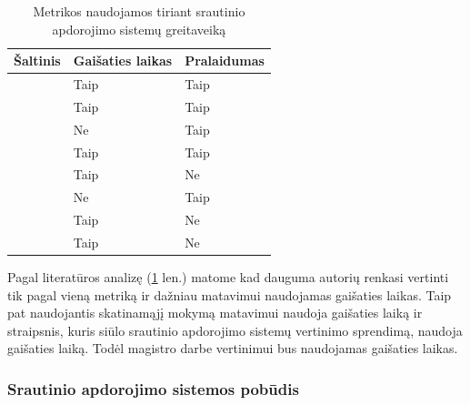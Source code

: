 \documentclass{VUMIFPSbakalaurinis}
\begin{document}
\begin{table}[H]
    \centering
    \begin{tabular}{|l|l|l|}
    \hline
    Šaltinis                 & Gaišaties laikas                 & Pralaidumas                    \\ \hline
    \cite{stonebraker20058}  & Taip                             & Taip                           \\ \hline
    \cite{Karimov2018BenchmarkingDS} & Taip                     & Taip                           \\ \hline
    \cite{hirzel2014catalog} & Ne                               & Taip                           \\ \hline
    \cite{Qian2016Benchmarking} & Taip                          & Taip                           \\ \hline
    \cite{zhang2020heron}    & Taip                             & Ne                             \\ \hline
    \cite{dhalion}           & Ne                               & Taip                           \\ \hline
    \cite{vaquero2018autotuning} & Taip                         & Ne                             \\ \hline
    \cite{Chintapalli2016Benchmarking} & Taip                   & Ne                             \\ \hline
    \end{tabular}
    \caption{Metrikos naudojamos tiriant srautinio apdorojimo sistemų greitaveiką}
\label{metrikos}
\end{table}

Pagal literatūros analizę (\ref{metrikos} len.) matome kad dauguma autorių renkasi vertinti tik pagal vieną metriką ir dažniau matavimui naudojamas gaišaties laikas. Taip pat \cite{vaquero2018autotuning} naudojantis skatinamąjį mokymą matavimui naudoja gaišaties laiką ir \cite{Chintapalli2016Benchmarking} straipsnis, kuris siūlo srautinio apdorojimo sistemų vertinimo sprendimą, naudoja gaišaties laiką. Todėl magistro darbe vertinimui bus naudojamas gaišaties laikas.   

\subsubsection{Srautinio apdorojimo sistemos pobūdis}
\end{document}
